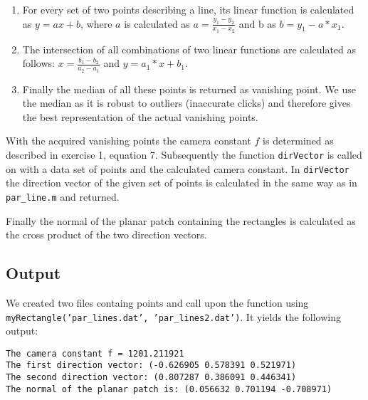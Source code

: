 \documentclass{article}
\begin{document}
\begin{enumerate}
 \item For every set of two points describing a line, its linear function is calculated as $y = ax + b$, where $a$ is calculated as $a = \frac{y_1-y_2}{x_1-x_2}$ and b as $b = y_1 - a*x_1$.
 \item The intersection of all combinations of two linear functions are calculated as follows: $x = \frac{b_1 - b_2}{a_2 - a_1}$ and $y = a_1*x + b_1$.
 \item Finally the median of all these points is returned as vanishing point. We use the median as it is robust to outliers (inaccurate clicks) and therefore gives the best representation of the actual vanishing points.
\end{enumerate}

With the acquired vanishing points the camera constant $f$ is determined as described in exercise 1, equation 7. Subsequently the function \texttt{dirVector} is called on with a data set of points and the calculated camera constant. In \texttt{dirVector} the direction vector of the given set of points is calculated in the same way as in \texttt{par\_line.m} and returned.

Finally the normal of the planar patch containing the rectangles is calculated as the cross product of the two direction vectors.

\subsection{Output}
We created two files containg points and call upon the function using \texttt{myRectangle('par\_lines.dat', 'par\_lines2.dat')}. It yields the following output:

\begin{lstlisting}
The camera constant f = 1201.211921
The first direction vector: (-0.626905 0.578391 0.521971)
The second direction vector: (0.807287 0.386091 0.446341)
The normal of the planar patch is: (0.056632 0.701194 -0.708971)
\end{lstlisting}
\end{document}
